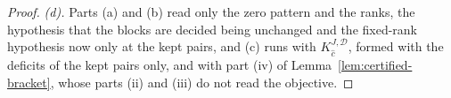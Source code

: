 \begin{proof}
\emph{(d).} Parts (a) and (b) read only the zero pattern and the ranks, the
hypothesis that the blocks are decided being unchanged and the fixed-rank
hypothesis now only at the kept pairs, and (c) runs with
$K^{J,\mathcal{D}}_{\hat c}$, formed with the deficits of the kept pairs
only, and with part (iv) of Lemma~\ref{lem:certified-bracket}, whose parts
(ii) and (iii) do not read the objective.
\end{proof}
